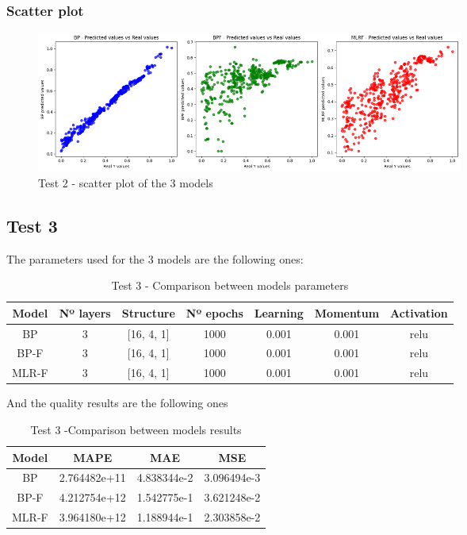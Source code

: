 \documentclass[11pt, a4paper]{article}
\begin{document}
\subsubsection{Scatter plot}

\begin{figure}[H]
    \centering
    \includegraphics[width=400pt]{images/test2_scatter.png}
    \caption{Test 2 - scatter plot of the 3 models}
    \label{fig:image_scatter_comparison_2}
\end{figure}

\subsection{Test 3}

The parameters used for the 3 models are the following ones:

\begin{table}[H]
    \centering
    \begin{tabular}{|c|c|c|c|c|c|c|}
        \hline
        \textbf{Model} & \textbf{Nº layers} & \textbf{Structure}  & \textbf{Nº epochs} & \textbf{Learning} & \textbf{Momentum} & \textbf{Activation} \\ \hline
        BP       & 3                & [16, 4, 1]    & 1000      & 0.001         & 0.001    & relu                \\ \hline
        BP-F     & 3                & [16, 4, 1]    & 1000      & 0.001         & 0.001    & relu                \\ \hline
        MLR-F    & 3                & [16, 4, 1]    & 1000      & 0.001         & 0.001    & relu              \\ \hline
    \end{tabular}
    \caption{Test 3 - Comparison between models parameters}
    \label{tab:table_parameters_comparison_3}
\end{table}

And the quality results are the following ones

\begin{table}[H]
    \centering
    \begin{tabular}{|c|c|c|c|}
        \hline
        \textbf{Model} & \textbf{MAPE}         & \textbf{MAE}         & \textbf{MSE}         \\ \hline
        BP & 2.764482e+11 & 4.838344e-2 & 3.096494e-3 \\ \hline
        BP-F & 4.212754e+12 & 1.542775e-1 & 3.621248e-2 \\ \hline
        MLR-F & 3.964180e+12 & 1.188944e-1 & 2.303858e-2 \\ \hline
    \end{tabular}
    \caption{Test 3 -Comparison between models results}
    \label{tab:table_results_comparison_3}
\end{table}
\end{document}
